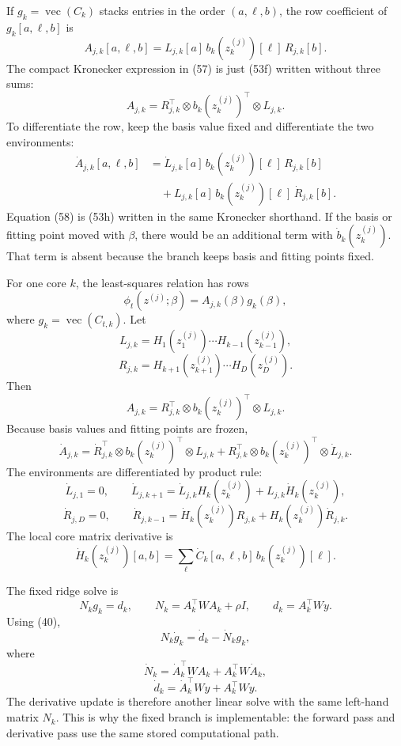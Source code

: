 \documentclass[11pt]{article}
\theoremstyle{remark}
\newcommand{\vecop}{\operatorname{vec}}
\begin{document}
If \(g_k=\vecop(C_k)\) stacks entries in the order \((a,\ell,b)\), the row
coefficient of \(g_k[a,\ell,b]\) is
\[
    A_{j,k}[a,\ell,b]
    =
    L_{j,k}[a]\,
    b_k(z_k^{(j)})[\ell]\,
    R_{j,k}[b].
    \tag{53f}
\]
The compact Kronecker expression in (57) is just (53f) written without three
sums:
\[
    A_{j,k}
    =
    R_{j,k}^{\top}\otimes b_k(z_k^{(j)})^\top\otimes L_{j,k}.
    \tag{53g}
\]
To differentiate the row, keep the basis value fixed and differentiate the
two environments:
\[
\begin{aligned}
    \dot A_{j,k}[a,\ell,b]
    &=
    \dot L_{j,k}[a]\,
    b_k(z_k^{(j)})[\ell]\,
    R_{j,k}[b]\\
    &\quad+
    L_{j,k}[a]\,
    b_k(z_k^{(j)})[\ell]\,
    \dot R_{j,k}[b].
\end{aligned}
    \tag{53h}
\]
Equation (58) is (53h) written in the same Kronecker shorthand.  If the basis
or fitting point moved with \(\beta\), there would be an additional term with
\(\dot b_k(z_k^{(j)})\).  That term is absent because the branch keeps basis
and fitting points fixed.

For one core \(k\), the least-squares relation has rows
\[
    \phi_t(z^{(j)};\beta)=A_{j,k}(\beta)g_k(\beta),
    \tag{54}
\]
where \(g_k=\vecop(C_{t,k})\).  Let
\[
    L_{j,k}
    =
    H_{1}(z_1^{(j)})\cdots H_{k-1}(z_{k-1}^{(j)}),
    \tag{55}
\]
\[
    R_{j,k}
    =
    H_{k+1}(z_{k+1}^{(j)})\cdots H_D(z_D^{(j)}).
    \tag{56}
\]
Then
\[
    A_{j,k}
    =
    R_{j,k}^{\top}\otimes b_k(z_k^{(j)})^\top\otimes L_{j,k}.
    \tag{57}
\]
Because basis values and fitting points are frozen,
\[
    \dot A_{j,k}
    =
    \dot R_{j,k}^{\top}\otimes b_k(z_k^{(j)})^\top\otimes L_{j,k}
    +
    R_{j,k}^{\top}\otimes b_k(z_k^{(j)})^\top\otimes \dot L_{j,k}.
    \tag{58}
\]
The environments are differentiated by product rule:
\[
    \dot L_{j,1}=0,
    \qquad
    \dot L_{j,k+1}
    =
    \dot L_{j,k}H_k(z_k^{(j)})
    +
    L_{j,k}\dot H_k(z_k^{(j)}),
    \tag{59}
\]
\[
    \dot R_{j,D}=0,
    \qquad
    \dot R_{j,k-1}
    =
    \dot H_k(z_k^{(j)})R_{j,k}
    +
    H_k(z_k^{(j)})\dot R_{j,k}.
    \tag{60}
\]
The local core matrix derivative is
\[
    \dot H_k(z_k^{(j)})[a,b]
    =
    \sum_{\ell}
    \dot C_k[a,\ell,b]\,b_k(z_k^{(j)})[\ell].
    \tag{61}
\]

The fixed ridge solve is
\[
    N_k g_k=d_k,
    \qquad
    N_k=A_k^\top W A_k+\rho I,
    \qquad
    d_k=A_k^\top W y.
    \tag{62}
\]
Using (40),
\[
    N_k\dot g_k=\dot d_k-\dot N_k g_k,
    \tag{63}
\]
where
\[
    \dot N_k=\dot A_k^\top W A_k+A_k^\top W\dot A_k,
    \tag{64}
\]
\[
    \dot d_k=\dot A_k^\top W y+A_k^\top W\dot y.
    \tag{65}
\]
The derivative update is therefore another linear solve with the same
left-hand matrix \(N_k\).  This is why the fixed branch is implementable: the
forward pass and derivative pass use the same stored computational path.
\end{document}
